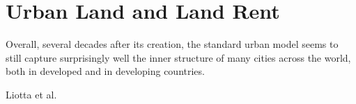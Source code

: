 \chapter{Urban Land and Land Rent} \label{chapter-space}

\epigraph{Overall, several decades after its creation, the standard urban model seems to still capture surprisingly well the inner structure of many cities across the world, both in developed and in developing countries.}{Liotta et al. 
 \cite{liottaTestingMonocentricStandard2022}}









